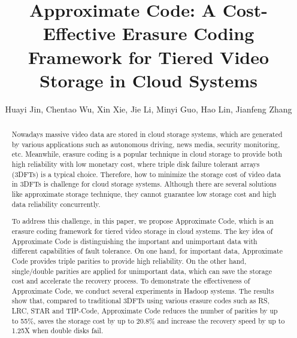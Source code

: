 \documentclass[sigconf]{acmart}
\begin{document}
\title{Approximate Code: A Cost-Effective Erasure Coding Framework for Tiered Video Storage in Cloud Systems}

\author{Huayi Jin, Chentao Wu, Xin Xie, Jie Li, Minyi Guo, Hao Lin, Jianfeng Zhang}

\begin{abstract}
Nowadays massive video data are stored in cloud storage systems, which are generated by various applications such as autonomous driving, news media, security monitoring, etc. Meanwhile, erasure coding is a popular technique in cloud storage to provide both high reliability with low monetary cost, where triple disk failure tolerant arrays (3DFTs) is a typical choice. Therefore, how to minimize the storage cost of video data in 3DFTs is challenge for cloud storage systems. Although there are several solutions like approximate storage technique, they cannot guarantee low storage cost and high data reliability concurrently.

To address this challenge, in this paper, we propose Approximate Code, which is an erasure coding framework for tiered video storage in cloud systems. The key idea of Approximate Code is distinguishing the important and unimportant data with different capabilities of fault tolerance. On one hand, for important data, Approximate Code provides triple parities to provide high reliability. On the other hand, single/double parities are applied for unimportant data, which can save the storage cost and accelerate the recovery process. To demonstrate the effectiveness of Approximate Code, we conduct several experiments in Hadoop systems. The results show that, compared to traditional 3DFTs using various erasure codes such as RS, LRC, STAR and TIP-Code, Approximate Code reduces the number of parities by up to 55\%, saves the storage cost by up to 20.8\% and increase the recovery speed by up to 1.25X when double disks fail.
\end{abstract}


\maketitle
\end{document}
